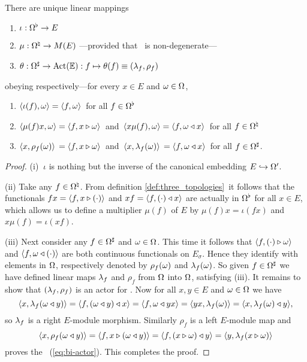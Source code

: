 \begin{prop} \label{prop:act_by_fuctionals}
  There are unique linear mappings
  \begin{enumerate}
    \item $\iota : \Omega^\flat \rightarrow E$
    \item $\mu   : \Omega^\natural \rightarrow M(E)$
                     \hspace{1em}---provided that \EE\ is non-degenerate---
    \item $\theta: \Omega^\sharp \rightarrow \mbox{\rm Act}(\mathbb{E}):
                     f \mapsto \theta(f)\equiv(\lambda_f,\rho_f)$
  \end{enumerate}
  obeying respectively---for every $x\in E$ and $\omega \in \Omega$,
  \begin{enumerate}
    \item $\langle \iota(f),\omega \rangle = \langle f,\omega \rangle\,$
          for all $f \in \Omega^\flat$
    \item $\langle \mu(f)x,\omega \rangle   = \langle f,x \triangleright \omega \rangle\,$ and
          $\,\langle x\mu(f),\omega \rangle = \langle f,\omega \triangleleft x \rangle\,$
          for all $f \in \Omega^\natural$
    \item $\langle x,\rho_f(\omega) \rangle\,   = \langle f,x \triangleright \omega \rangle\,$ and
          $\,\langle x,\lambda_f(\omega) \rangle\, = \langle f,\omega \triangleleft x \rangle\,$
          for all $f \in \Omega^\sharp$.
  \end{enumerate}
\end{prop}
%
\begin{proof}
  (i) $\:\iota$ is nothing but the inverse of the canonical embedding
  $E\hookrightarrow \Omega'$.

  (ii) Take any $f\in \Omega^\natural$. From definition \ref{def:three_topologies}\ it follows
  that the functionals $fx = \langle f,x \triangleright (\cdot) \rangle$ and $xf = \langle f,(\cdot) \triangleleft x \rangle$
  are actually in $\Omega^\flat$ for all $x\in E$, which allows us to define a multiplier
  $\mu(f)$ of $E$ by $\mu(f)x = \iota(fx)$ and $x\mu(f) = \iota(xf)$.

  (iii)  Next consider any $f\in \Omega^\sharp$ and $\omega \in \Omega$\@. This time it follows that
  $\langle f,(\cdot) \triangleright \omega \rangle$ and $\langle f,\omega \triangleleft (\cdot) \rangle$
  are both continuous functionals on $E_\sigma$\@. Hence they identify with elements in $\Omega$,
  respectively denoted by $\rho_f(\omega)$ and $\lambda_f(\omega)$.
  So given $f\in \Omega^\sharp$ we have defined linear maps $\lambda_f$ and $\rho_f$ from $\Omega$ into $\Omega$,
  satisfying (iii). It remains to show that $(\lambda_f,\rho_f)$ is an actor for \EE\@.
  Now for all $x,y \in E$ and $\omega \in \Omega$ we have
  $$\langle x,\lambda_f(\omega \triangleleft y) \rangle
         = \langle f,(\omega \triangleleft y) \triangleleft x \rangle
         = \langle f,\omega \triangleleft yx \rangle
         = \langle yx,\lambda_f(\omega) \rangle
         = \langle x,\lambda_f(\omega) \triangleleft y \rangle,  $$
  so $\lambda_f$ is a right $E$-module morphism.
  Similarly $\rho_f$ is a left $E$-module map and
  $$\langle x,\rho_f(\omega \triangleleft y) \rangle
       = \langle f,x \triangleright (\omega \triangleleft y) \rangle
       = \langle f,(x \triangleright \omega) \triangleleft y \rangle
       = \langle y,\lambda_f(x\triangleright\omega) \rangle $$
  proves the \biap\ (\ref{eq:bi-actor}). This completes the proof.
\end{proof}


